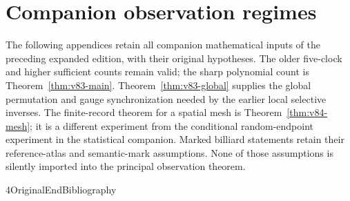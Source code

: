 







\appendix
\section*{Companion observation regimes}
The following appendices retain all companion mathematical inputs of the
preceding expanded edition, with their original hypotheses. The older
five-clock and higher sufficient counts remain valid; the sharp
polynomial count is Theorem~\ref{thm:v83-main}. Theorem~\ref{thm:v83-global}
supplies the global permutation and gauge synchronization needed by the
earlier local selective inverses. The finite-record theorem for a spatial
mesh is Theorem~\ref{thm:v84-mesh}; it is a different experiment from the
conditional random-endpoint experiment in the statistical companion.
Marked billiard statements retain their reference-atlas and semantic-mark
assumptions. None of those assumptions is silently imported into the
principal observation theorem.
















\let\VPreviousSection\section
\def\section#1{\let\section\VPreviousSection
\section{Convex twist suspensions: six conditional laws and four raw laws}}







\let\V84OriginalEndBibliography\endthebibliography
\def\endthebibliography{\V84OriginalEndBibliography}


